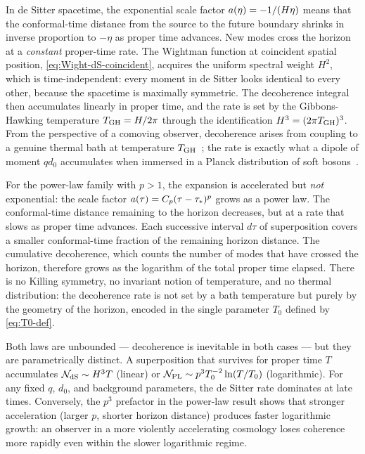 In de Sitter spacetime, the exponential scale factor $a(\eta) = -1/(H\eta)$
means that the conformal-time distance from the source to the future boundary
shrinks in inverse proportion to $-\eta$ as proper time advances.  New modes
cross the horizon at a \emph{constant} proper-time rate.  The Wightman function
at coincident spatial position, \cref{eq:Wight-dS-coincident}, acquires the
uniform spectral weight $H^2$, which is time-independent: every moment in
de Sitter looks identical to every other, because the spacetime is maximally
symmetric.  The decoherence integral then accumulates linearly in proper time,
and the rate is set by the Gibbons-Hawking temperature $T_{\rm GH} = H/2\pi$
through the identification $H^3 = (2\pi T_{\rm GH})^3$.  From the perspective
of a comoving observer, decoherence arises from coupling to a genuine thermal
bath at temperature $T_{\rm GH}$~\cite{Gibbons:1977mu,Danielson:2022tdw}; the
rate is exactly what a dipole of moment $qd_0$ accumulates when immersed in a
Planck distribution of soft bosons~\cite{Danielson:2024yge}.

For the power-law family with $p > 1$, the expansion is accelerated but
\emph{not} exponential: the scale factor $a(\tau) = C_p(\tau - \tau_*)^p$
grows as a power law.  The conformal-time distance remaining to the horizon
decreases, but at a rate that slows as proper time advances.  Each successive
interval $d\tau$ of superposition covers a smaller conformal-time fraction of
the remaining horizon distance.  The cumulative decoherence, which counts the
number of modes that have crossed the horizon, therefore grows as the logarithm
of the total proper time elapsed.  There is no Killing symmetry, no invariant
notion of temperature, and no thermal distribution: the decoherence rate is not
set by a bath temperature but purely by the geometry of the horizon, encoded in
the single parameter $T_0$ defined by \cref{eq:T0-def}.

Both laws are unbounded — decoherence is inevitable in both cases — but they
are parametrically distinct.  A superposition that survives for proper time $T$
accumulates $\mathcal{N}_{\rm dS} \sim H^3 T$ (linear) or
$\mathcal{N}_{\rm PL} \sim p^3 T_0^{-2} \ln(T/T_0)$ (logarithmic).  For any fixed
$q$, $d_0$, and background parameters, the de Sitter rate dominates at late
times.  Conversely, the $p^3$ prefactor in the power-law result shows that
stronger acceleration (larger $p$, shorter horizon distance) produces faster
logarithmic growth: an observer in a more violently accelerating cosmology
loses coherence more rapidly even within the slower logarithmic regime.

